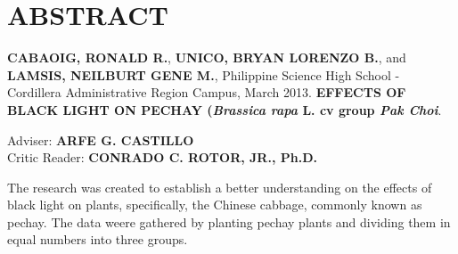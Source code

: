 \chapter{ABSTRACT}
{\singlespacing\noindent
\textbf{CABAOIG, RONALD R.}, \textbf{UNICO, BRYAN LORENZO B.}, and \textbf{LAMSIS, NEILBURT GENE M.}, 
Philippine Science High School - Cordillera Administrative Region Campus, March 2013. \textbf{EFFECTS 
OF  BLACK LIGHT ON PECHAY (\textit{Brassica rapa} L. cv group \textit{Pak Choi}}.

\begin{flushleft}
Adviser: \textbf{ARFE G. CASTILLO}\\
Critic Reader: \textbf{CONRADO C. ROTOR, JR., Ph.D.}
\end{flushleft}

The research was created to establish a better understanding on the effects  of black light on 
plants, specifically, the Chinese cabbage, commonly known as pechay. The data weere gathered 
by planting pechay plants and dividing them in equal numbers into three groups.
}

\newpage